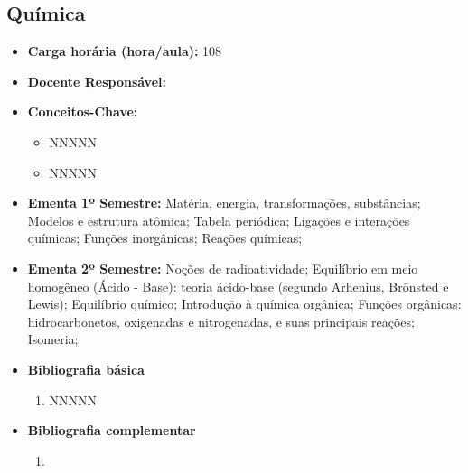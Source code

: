 \documentclass[11pt,fleqn]{book} %
\begin{document}
\subsection{Química}\label{disc:quimica}
\begin{itemize}
	\item \textbf{Carga horária (hora/aula):} 108
	\item \textbf{Docente Responsável:}
	\item \textbf{Conceitos-Chave:}
	\begin{itemize}
		\item NNNNN
		\item NNNNN
	\end{itemize}
	\item \textbf{Ementa 1º Semestre:} 
	Matéria, energia, transformações, substâncias;
	Modelos e estrutura atômica;
	Tabela periódica;
	Ligações e interações químicas;
	Funções inorgânicas;
	Reações químicas;
	\item \textbf{Ementa 2º Semestre:} 	
	Noções de radioatividade;
	Equilíbrio em meio homogêneo (Ácido - Base): teoria ácido-base (segundo Arhenius, Brönsted e Lewis);
	Equilíbrio químico;
	Introdução à química orgânica;
	Funções orgânicas: hidrocarbonetos, oxigenadas e nitrogenadas, e suas principais reações; 
	Isomeria;
	\item \textbf{Bibliografia básica}
	\begin{enumerate}
		\item NNNNN
	\end{enumerate}
	\item \textbf{Bibliografia complementar}
	\begin{enumerate}
		\item 
	\end{enumerate}	
\end{itemize}


\newpage
\end{document}
